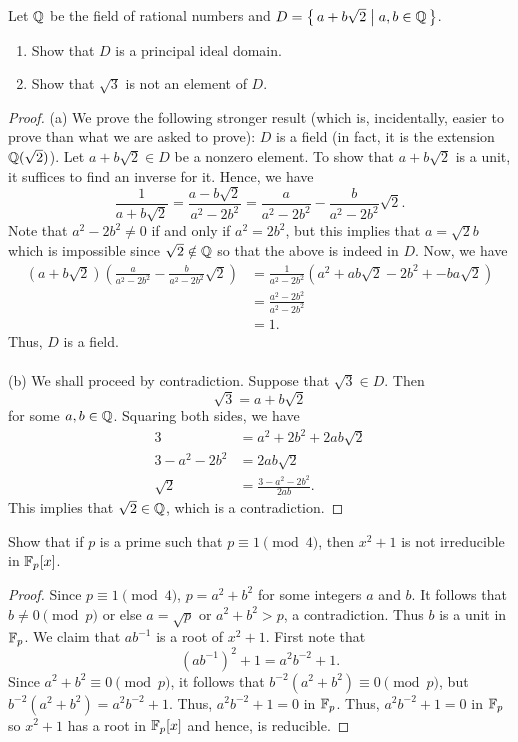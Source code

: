\begin{problem}
Let $\mathbb{Q}$ be the field of rational numbers and
$D=\left\{\,a+b\sqrt{2}\;\middle|\;a,b\in\mathbb{Q}\,\right\}$.
\begin{enumerate}[label=(\alph*)]
\item Show that $D$ is a principal ideal domain.
\item Show that $\sqrt{3}$ is not an element of $D$.
\end{enumerate}
\end{problem}
\begin{proof}
(a) We prove the following stronger result (which is, incidentally, easier
to prove than what we are asked to prove): $D$ is a field (in fact, it is
the extension $\mathbb{Q}(\sqrt{2})$). Let $a+b\sqrt{2}\in D$ be a nonzero
element. To show that $a+b\sqrt{2}$ is a unit, it suffices to find an
inverse for it. Hence, we have
\[
\frac{1}{a+b\sqrt{2}}=\frac{a-b\sqrt{2}}{a^2-2b^2}=\frac{a}{a^2-2b^2}-\frac{b}{a^2-2b^2}\sqrt{2}.
\]
Note that $a^2-2b^2\neq 0$ if and only if $a^2=2b^2$, but this implies that
$a=\sqrt{2}b$ which is impossible since $\sqrt{2}\notin\mathbb{Q}$ so that the
above is indeed in $D$. Now, we have
\begin{align*}
(a+b\sqrt{2})\left(\frac{a}{a^2-2b^2}-\frac{b}{a^2-2b^2}\sqrt{2}\right)
&=\frac{1}{a^2-2b^2}\left(a^2+ab\sqrt{2}-2b^2+-ba\sqrt{2}\right)\\
&=\frac{a^2-2b^2}{a^2-2b^2}\\
&=1.
\end{align*}
Thus, $D$ is a field.
\\\\
(b) We shall proceed by contradiction. Suppose that $\sqrt{3}\in D$. Then
\[
\sqrt{3}=a+b\sqrt{2}
\]
for some $a,b\in\mathbb{Q}$. Squaring both sides, we have
\begin{align*}
3&=a^2+2b^2+2ab\sqrt{2}\\
3-a^2-2b^2&=2ab\sqrt{2}\\
\sqrt{2}&=\frac{3-a^2-2b^2}{2ab}.
\end{align*}
This implies that $\sqrt{2}\in\mathbb{Q}$, which is a contradiction.
\end{proof}

\begin{problem}
Show that if $p$ is a prime such that $p\equiv 1\pmod{4}$, then $x^2+1$ is
not irreducible in $\mathbb{F}_p[x]$.
\end{problem}
\begin{proof}
Since $p\equiv 1\pmod{4}$, $p=a^2+b^2$ for some integers $a$ and $b$. It
follows that $b\neq 0\pmod{p}$ or else $a=\sqrt{p}$ or $a^2+b^2>p$, a
contradiction. Thus $b$ is a unit in $\mathbb{F}_p$. We claim that $ab^{-1}$ is a
root of $x^2+1$. First note that
\[
(ab^{-1})^2+1=a^2b^{-2}+1.
\]
Since $a^2+b^2\equiv 0\pmod{p}$, it follows that $b^{-2}(a^2+b^2)\equiv
0\pmod{p}$, but $b^{-2}(a^2+b^2)=a^2b^{-2}+1$. Thus, $a^2b^{-2}+1=0$ in
$\mathbb{F}_p$. Thus, $a^2b^{-2}+1=0$ in $\mathbb{F}_p$ so $x^2+1$ has a root in
$\mathbb{F}_p[x]$ and hence, is reducible.
\end{proof}

